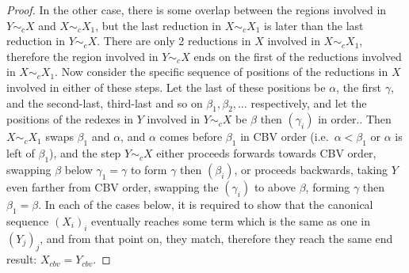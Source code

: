 \documentclass{article}
\theoremstyle{definition}
\theoremstyle{lemma}
\theoremstyle{remark}
\begin{document}
\begin{proof}
In the other case, there is some overlap between the regions involved in $Y \sim_c X$ and $X \sim_c X_1$, but the last reduction in $X \sim_c X_1$ is later than the last reduction in $Y \sim_c X$. There are only 2 reductions in $X$ involved in $X \sim_c X_1$, therefore the region involved in $Y \sim_c X$ ends on the first of the reductions involved in $X \sim_c X_1$. Now consider the specific sequence of positions of the reductions in $X$ involved in either of these steps. Let the last of these positions be $\alpha$, the first $\gamma$, and the second-last, third-last and so on $\beta_1, \beta_2, \dots$ respectively, and let the positions of the redexes in $Y$ involved in $Y \sim_c X$ be $\beta$ then $(\gamma_i)$ in order.. Then $X \sim_c X_1$ swaps $\beta_1$ and $\alpha$, and $\alpha$ comes before $\beta_1$ in CBV order (i.e.~$\alpha < \beta_1$ or $\alpha$ is left of $\beta_1$), and the step $Y \sim_c X$ either proceeds forwards towards CBV order, swapping $\beta$ below $\gamma_1 = \gamma$ to form $\gamma$ then $(\beta_i)$, or proceeds backwards, taking $Y$ even farther from CBV order, swapping the $(\gamma_i)$ to above $\beta$, forming $\gamma$ then $\beta_1 = \beta$. In each of the cases below, it is required to show that the canonical sequence $(X_i)_i$ eventually reaches some term which is the same as one in $(Y_j)_j$, and from that point on, they match, therefore they reach the same end result: $X_{cbv} = Y_{cbv}$.


\end{proof}
\end{document}
